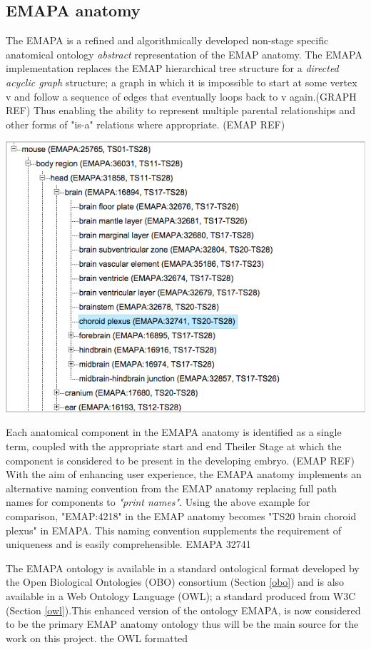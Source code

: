 \subsection{EMAPA anatomy}\label{emapaanatomy}
The EMAPA is a refined and algorithmically developed non-stage specific anatomical ontology \textit{abstract} representation of the EMAP anatomy. The EMAPA implementation replaces the EMAP hierarchical tree structure for a \textit{directed acyclic graph} structure; a graph in which it is impossible to start at some vertex v and follow a sequence of edges that eventually loops back to v again.(GRAPH REF) Thus enabling the ability to represent multiple parental relationships and other forms of "is-a" relations where appropriate. (EMAP REF)\begin{center}\includegraphics[width=1\linewidth]{images/emapachoroidplexus}\end{center}

Each anatomical component in the EMAPA anatomy is identified as a single term, coupled with the appropriate start and end Theiler Stage at which the component is considered to be present in the developing embryo. (EMAP REF) With the aim of enhancing user experience, the EMAPA anatomy  implements an alternative naming convention from the EMAP anatomy replacing full path names for components to \textit{"print names"}. Using the above example for comparison, "EMAP:4218" in the EMAP anatomy becomes "TS20 brain choroid plexus" in EMAPA. This naming convention supplements the requirement of uniqueness and is easily comprehensible. EMAPA 32741  

The EMAPA ontology is available in a standard ontological format developed by the Open Biological Ontologies (OBO) consortium (Section \ref{obo}) and is also available in a Web Ontology Language (OWL); a standard produced from W3C (Section \ref{owl}).This enhanced version of the ontology EMAPA, is now considered to be the primary EMAP anatomy ontology thus will be the main source for the work on this project. the OWL formatted



